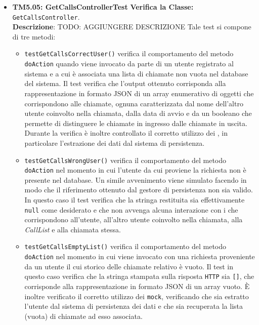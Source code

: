 \begin{itemize}
\item \textbf{TM5.05: GetCallsControllerTest} 
\textbf{Verifica la Classe:} \texttt{GetCallsController}.\\
\textbf{Descrizione}: TODO: AGGIUNGERE DESCRIZIONE
Tale test si compone di tre metodi:
\begin{itemize}
\item \texttt{testGetCallsCorrectUser()} verifica il comportamento del metodo \texttt{doAction} quando viene invocato da parte di un utente registrato al sistema e a cui è associata una lista di chiamate non vuota nel database del sistema. Il test verifica che l'output ottenuto corrisponda alla rappresentazione in formato JSON di un array enumerativo di oggetti che corrispondono alle chiamate, ognuna caratterizzata dal nome dell'altro utente coinvolto nella chiamata, dalla data di avvio e da un  booleano che permette di distinguere le chiamate in ingresso dalle chiamate in uscita. Durante la verifica è inoltre controllato il corretto utilizzo dei , in particolare l'estrazione dei dati dal sistema di persistenza.\\
\item \texttt{testGetCallsWrongUser()} verifica il comportamento del metodo \texttt{doAction} nel momento in cui l'utente da cui proviene la richiesta non è presente nel database. Un simile avvenimento viene simulato facendo in modo che il riferimento ottenuto dal gestore di persistenza non sia valido. In questo caso il test verifica che la stringa restituita sia effettivamente \texttt{null} come desiderato e che non avvenga alcuna interazione con i  che corrispondono all'utente, all'altro utente coinvolto nella chiamata, alla \textit{CallList} e alla chiamata stessa.
\item \texttt{testGetCallsEmptyList()} verifica il comportamento del metodo \texttt{doAction} nel momento in cui viene invocato con una richiesta proveniente da un utente il cui storico delle chiamate relativo è vuoto. Il test in questo caso verifica che la stringa stampata sulla risposta \texttt{HTTP} sia \texttt{[]}, che corrisponde alla rappresentazione in formato JSON di un array vuoto. È inoltre verificato il corretto utilizzo dei \texttt{mock}, verificando che sia estratto l'utente dal sistema di persistenza dei dati e che sia recuperata la lista (vuota) di chiamate ad esso associata.
\end{itemize}



\end{itemize}
